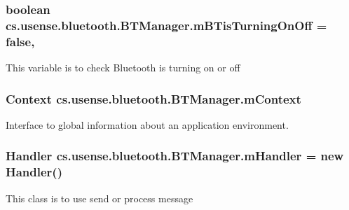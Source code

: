 \subsubsection[{m\+B\+Tis\+Turning\+On\+Off}]{\setlength{\rightskip}{0pt plus 5cm}boolean cs.\+usense.\+bluetooth.\+B\+T\+Manager.\+m\+B\+Tis\+Turning\+On\+Off = false\hspace{0.3cm}{\ttfamily [static]}, {\ttfamily [private]}}\label{classcs_1_1usense_1_1bluetooth_1_1_b_t_manager_a49b258b5af884eb047ec2360f4ca3c0b}
This variable is to check Bluetooth is turning on or off \hypertarget{classcs_1_1usense_1_1bluetooth_1_1_b_t_manager_abd0ee7affd39e2c98ec93d60c00d72ad}{}
\subsubsection[{m\+Context}]{\setlength{\rightskip}{0pt plus 5cm}Context cs.\+usense.\+bluetooth.\+B\+T\+Manager.\+m\+Context\hspace{0.3cm}{\ttfamily [private]}}\label{classcs_1_1usense_1_1bluetooth_1_1_b_t_manager_abd0ee7affd39e2c98ec93d60c00d72ad}
Interface to global information about an application environment. \hypertarget{classcs_1_1usense_1_1bluetooth_1_1_b_t_manager_a34f0247df92d1f695334948e7f5a064a}{}
\subsubsection[{m\+Handler}]{\setlength{\rightskip}{0pt plus 5cm}Handler cs.\+usense.\+bluetooth.\+B\+T\+Manager.\+m\+Handler = new Handler()\hspace{0.3cm}{\ttfamily [private]}}\label{classcs_1_1usense_1_1bluetooth_1_1_b_t_manager_a34f0247df92d1f695334948e7f5a064a}
This class is to use send or process message \hypertarget{classcs_1_1usense_1_1bluetooth_1_1_b_t_manager_a92284865c642201dbf7a1a30458ee035}{}

